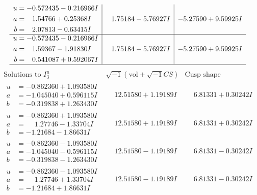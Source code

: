 \documentclass[1p]{elsarticle_modified}
\theoremstyle{definition}
\newcommand{\I}{\sqrt{-1}}
\begin{document}
$$\begin{array}{c|c|c}
\begin{aligned}
u &= -0.572435 - 0.216966 I \\
a &= \phantom{-}1.54766 + 0.25368 I \\
b &= \phantom{-}2.07813 - 0.63415 I\end{aligned}
 & \phantom{-}1.75184 - 5.76927 I & -5.27590 + 9.59925 I \\ \hline\begin{aligned}
u &= -0.572435 - 0.216966 I \\
a &= \phantom{-}1.59367 - 1.91830 I \\
b &= \phantom{-}0.541087 + 0.592067 I\end{aligned}
 & \phantom{-}1.75184 - 5.76927 I & -5.27590 + 9.59925 I\\
 \hline 
 \end{array}$$\newpage$$\begin{array}{c|c|c}  
\text{Solutions to }I^u_{3}& \I (\text{vol} + \sqrt{-1}CS) & \text{Cusp shape}\\
 \hline 
\begin{aligned}
u &= -0.862360 + 1.093580 I \\
a &= -1.045040 + 0.596115 I \\
b &= -0.319838 + 1.263430 I\end{aligned}
 & \phantom{-}12.51580 + 1.19189 I & \phantom{-}6.81331 + 0.30242 I \\ \hline\begin{aligned}
u &= -0.862360 + 1.093580 I \\
a &= \phantom{-}1.27746 - 1.33704 I \\
b &= -1.21684 - 1.86631 I\end{aligned}
 & \phantom{-}12.51580 + 1.19189 I & \phantom{-}6.81331 + 0.30242 I \\ \hline\begin{aligned}
u &= -0.862360 - 1.093580 I \\
a &= -1.045040 - 0.596115 I \\
b &= -0.319838 - 1.263430 I\end{aligned}
 & \phantom{-}12.51580 - 1.19189 I & \phantom{-}6.81331 - 0.30242 I \\ \hline\begin{aligned}
u &= -0.862360 - 1.093580 I \\
a &= \phantom{-}1.27746 + 1.33704 I \\
b &= -1.21684 + 1.86631 I\end{aligned}
 & \phantom{-}12.51580 - 1.19189 I & \phantom{-}6.81331 - 0.30242 I \\ \hline\begin{aligned}

\end{aligned}
\end{array}$$
\end{document}
